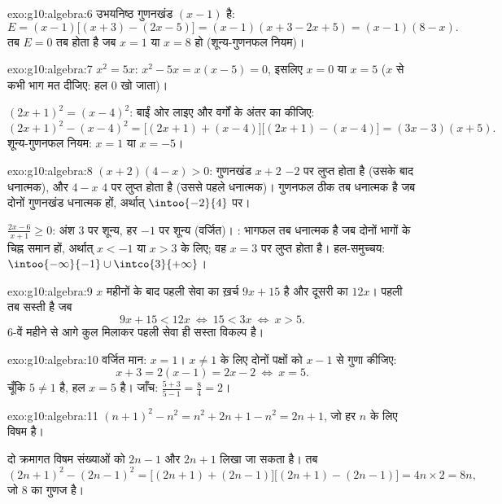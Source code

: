 \begin{solution}{exo:g10:algebra:6}
उभयनिष्ठ गुणनखंड $(x-1)$ है:
\[
E = (x-1)\bigl[(x+3) - (2x - 5)\bigr] = (x-1)(x + 3 - 2x + 5)
= (x-1)(8 - x).
\]
तब $E = 0$ तब होता है जब $x = 1$ या $x = 8$ हो (शून्य-गुणनफल नियम)।
\end{solution}

\begin{solution}{exo:g10:algebra:7}
$x^2 = 5x$: $x^2 - 5x = x(x - 5) = 0$, इसलिए $x = 0$ या $x = 5$ ($x$ से कभी भाग मत दीजिए: हल $0$ खो जाता)।

$(2x+1)^2 = (x-4)^2$: बाईं ओर लाइए और वर्गों के अंतर का  कीजिए:
\[
(2x+1)^2 - (x-4)^2
= \bigl[(2x+1) + (x-4)\bigr]\bigl[(2x+1) - (x-4)\bigr]
= (3x - 3)(x + 5).
\]
शून्य-गुणनफल नियम: $x = 1$ या $x = -5$।
\end{solution}

\begin{solution}{exo:g10:algebra:8}
$(x+2)(4-x) > 0$: गुणनखंड $x + 2$ $-2$ पर लुप्त होता है (उसके बाद धनात्मक), और $4 - x$ $4$
पर लुप्त होता है (उससे पहले धनात्मक)। गुणनफल ठीक तब धनात्मक है जब दोनों
गुणनखंड धनात्मक हों, अर्थात् $\intoo{-2}{4}$ पर।

$\frac{2x-6}{x+1} \geq 0$: अंश $3$ पर शून्य, हर $-1$ पर शून्य (वर्जित)। : भागफल तब
धनात्मक है जब दोनों भागों के चिह्न समान हों, अर्थात् $x < -1$ या $x > 3$ के लिए;
वह $x = 3$ पर लुप्त होता है। हल-समुच्चय: $\intoo{-\infty}{-1} \cup \intco{3}{+\infty}$।
\end{solution}

\begin{solution}{exo:g10:algebra:9}
$x$ महीनों के बाद पहली सेवा का ख़र्च $9x + 15$ है और दूसरी का $12x$। पहली तब
सस्ती है जब
\[
9x + 15 < 12x
\ \Longleftrightarrow\
15 < 3x
\ \Longleftrightarrow\
x > 5 .
\]
$6$-वें महीने से आगे कुल मिलाकर पहली सेवा ही सस्ता विकल्प है।
\end{solution}

\begin{solution}{exo:g10:algebra:10}
वर्जित मान: $x = 1$। $x \neq 1$ के लिए दोनों पक्षों को $x - 1$ से गुणा कीजिए:
\[
x + 3 = 2(x - 1) = 2x - 2
\ \Longleftrightarrow\
x = 5 .
\]
चूँकि $5 \neq 1$ है, हल $x = 5$ है। जाँच: $\frac{5+3}{5-1} = \frac84 = 2$।
\end{solution}

\begin{solution}{exo:g10:algebra:11}
$(n+1)^2 - n^2 = n^2 + 2n + 1 - n^2 = 2n + 1$, जो हर  $n$ के लिए विषम है।

दो क्रमागत विषम संख्याओं को $2n - 1$ और $2n + 1$ लिखा जा सकता है। तब
\[
(2n+1)^2 - (2n-1)^2
= \bigl[(2n+1)+(2n-1)\bigr]\bigl[(2n+1)-(2n-1)\bigr]
= 4n \times 2 = 8n,
\]
जो $8$ का गुणज है।
\end{solution}


